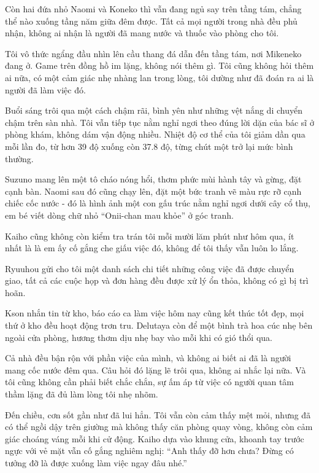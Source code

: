 \documentclass[../main.tex]{subfiles}
\begin{document}
Còn hai đứa nhỏ Naomi và Koneko thì vẫn đang ngủ say trên tầng tám, chẳng thể nào xuống tầng năm giữa đêm được. Tất cả mọi người trong nhà đều phủ nhận, không ai nhận là người đã mang nước và thuốc vào phòng cho tôi.

Tôi vô thức ngẩng đầu nhìn lên cầu thang đá dẫn đến tầng tám, nơi Mikeneko đang ở. Game trên đồng hồ im lặng, không nói thêm gì. Tôi cũng không hỏi thêm ai nữa, có một cảm giác nhẹ nhàng lan trong lòng, tôi dường như đã đoán ra ai là người đã làm việc đó.

\ct

Buổi sáng trôi qua một cách chậm rãi, bình yên như những vệt nắng di chuyển chậm trên sàn nhà. Tôi vẫn tiếp tục nằm nghỉ ngơi theo đúng lời dặn của bác sĩ ở phòng khám, không dám vận động nhiều. Nhiệt độ cơ thể của tôi giảm dần qua mỗi lần đo, từ hơn 39 độ xuống còn 37.8 độ, từng chút một trở lại mức bình thường.

Suzuno mang lên một tô cháo nóng hổi, thơm phức mùi hành tây và gừng, đặt cạnh bàn. Naomi sau đó cũng chạy lên, đặt một bức tranh vẽ màu rực rỡ cạnh chiếc cốc nước - đó là hình ảnh một con gấu trúc nằm nghỉ ngơi dưới cây cổ thụ, em bé viết dòng chữ nhỏ ``Onii-chan mau khỏe'' ở góc tranh.

Kaiho cũng không còn kiểm tra trán tôi mỗi mười lăm phút như hôm qua, ít nhất là là em ấy cố gắng che giấu việc đó, không để tôi thấy vẫn luôn lo lắng.

Ryuuhou gửi cho tôi một danh sách chi tiết những công việc đã được chuyển giao, tất cả các cuộc họp và đơn hàng đều được xử lý ổn thỏa, không có gì bị trì hoãn.

Kson nhắn tin từ kho, báo cáo ca làm việc hôm nay cũng kết thúc tốt đẹp, mọi thứ ở kho đều hoạt động trơn tru. Delutaya còn để một bình trà hoa cúc nhẹ bên ngoài cửa phòng, hương thơm dịu nhẹ bay vào mỗi khi có gió thổi qua.

Cả nhà đều bận rộn với phần việc của mình, và không ai biết ai đã là người mang cốc nước đêm qua. Câu hỏi đó lặng lẽ trôi qua, không ai nhắc lại nữa. Và tôi cũng không cần phải biết chắc chắn, sự ấm áp từ việc có người quan tâm thầm lặng đã đủ làm lòng tôi nhẹ nhõm.

Đến chiều, cơn sốt gần như đã lui hẳn. Tôi vẫn còn cảm thấy mệt mỏi, nhưng đã có thể ngồi dậy trên giường mà không thấy căn phòng quay vòng, không còn cảm giác choáng váng mỗi khi cử động. Kaiho dựa vào khung cửa, khoanh tay trước ngực với vẻ mặt vẫn cố gắng nghiêm nghị: ``Anh thấy đỡ hơn chưa? Đừng có tưởng đỡ là được xuống làm việc ngay đâu nhé.''
\end{document}
